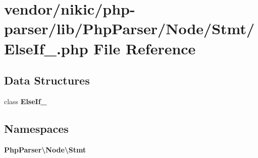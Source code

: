 \section{vendor/nikic/php-\/parser/lib/\+Php\+Parser/\+Node/\+Stmt/\+Else\+If\+\_\+.php File Reference}
\label{_else_if___8php}
\subsection*{Data Structures}
\begin{DoxyCompactItemize}
\item 
class {\bf Else\+If\+\_\+}
\end{DoxyCompactItemize}
\subsection*{Namespaces}
\begin{DoxyCompactItemize}
\item 
 {\bf Php\+Parser\textbackslash{}\+Node\textbackslash{}\+Stmt}
\end{DoxyCompactItemize}
